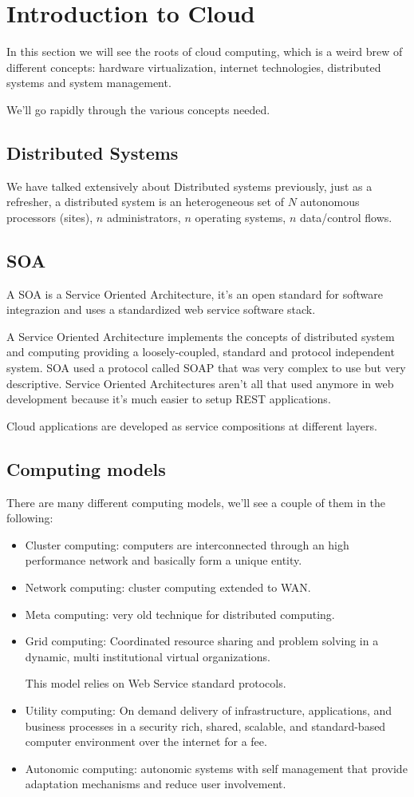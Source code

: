 \chapter{Introduction to Cloud}
In this section we will see the roots of cloud computing, which is a weird brew of different concepts: hardware virtualization, internet technologies, distributed systems and system management.

We'll go rapidly through the various concepts needed.
\section{Distributed Systems}
We have talked extensively about Distributed systems previously, just as a refresher, a distributed system is an heterogeneous set of $N$ autonomous processors (sites), $n$ administrators, $n$ operating systems, $n$ data/control flows.

\section{SOA}
A SOA is a Service Oriented Architecture, it's an open standard for software integrazion and uses a standardized web service software stack.

A Service Oriented Architecture implements the concepts of distributed system and computing providing a loosely-coupled, standard and protocol independent system. SOA used a protocol called SOAP that was very complex to use but very descriptive. Service Oriented Architectures aren't all that used anymore in web development because it's much easier to setup REST applications.

Cloud applications are developed as service compositions at different layers.

\section{Computing models}
There are many different computing models, we'll see a couple of them in the following:
\begin{itemize}
    \item Cluster computing: computers are interconnected through an high performance network and basically form a unique entity.
    \item Network computing: cluster computing extended to WAN.
    \item Meta computing: very old technique for distributed computing.
    \item Grid computing: Coordinated resource sharing and problem solving in a dynamic, multi institutional virtual organizations.

    This model relies on Web Service standard protocols.
    \item Utility computing: On demand delivery of infrastructure, applications, and business processes in a security rich, shared, scalable, and standard-based computer environment over the internet for a fee.
    \item Autonomic computing: autonomic systems with self management that provide adaptation mechanisms and reduce user involvement.
\end{itemize}

